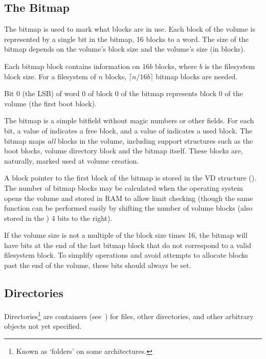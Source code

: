 \subsection{The Bitmap}
\label{sec:fs-bitmap}

The bitmap is used to mark what blocks are in use. Each block of the volume is
represented by a single bit in the bitmap, 16 blocks to a word. The size of the
bitmap depends on the volume's block size and the volume's size (in
blocks).

Each bitmap block contains information on $16b$ blocks, where $b$ is the
filesystem block size. For a filesystem of $n$ blocks, $\lceil n/16b\rceil$
bitmap blocks are needed.

Bit 0 (the \gls{LSB}) of word 0 of block 0 of the bitmap represents block 0 of
the volume (the first boot block).

The bitmap is a simple bitfield without magic numbers or other fields. For each
bit, a value of  indicates a free block, and a value of 
indicates a used block. The bitmap maps {\em all\/} blocks in the volume,
including support structures such as the boot blocks, volume directory block
and the bitmap itself. These blocks are, naturally, marked used at volume
creation.

A \gls{block pointer} to the first block of the bitmap is stored in the
\gls{VD} structure (). The number of bitmap blocks may be
calculated when the operating system opens the volume and stored in RAM to
allow limit checking (though the same function can be performed easily by
shifting the number of volume blocks (also stored in the ) 4 bits
to the right).

If the volume size is not a multiple of the block size times 16, the bitmap
will have bits at the end of the last bitmap block that do not correspond to a
valid filesystem block. To simplify operations and avoid attempts to allocate
blocks past the end of the volume, these bits should always be set.



\subsection{Directories}
\label{sec:fs-directories}

Directories\footnote{Known as ‘folders’ on some architectures.} are
\glspl{container} (see~) for files, other directories,
and other arbitrary objects not yet specified.

